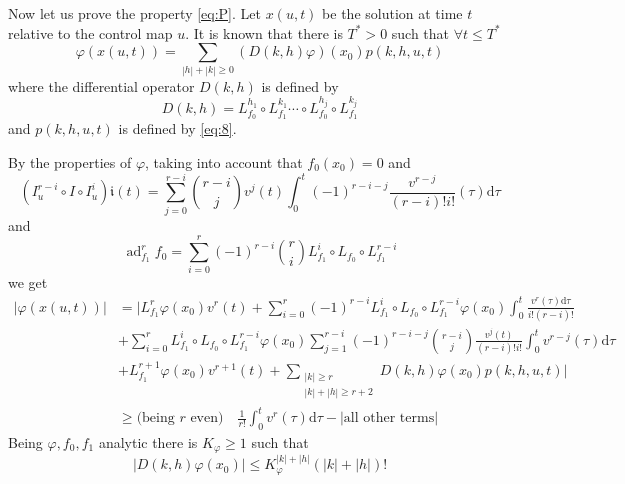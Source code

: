 \documentclass{article}
\newcommand{\dd}{\mathrm{d}}
\begin{document}
	
Now let us prove the property \eqref{eq:P}.
Let $x(u, t)$ be the solution at time $t$ relative to the control map $u$. It is known \cite{1,3} that there is $T^*>0$ such that $\forall t \leq T^*$
\begin{equation} \label{eq:15}
	\varphi(x(u, t))=\sum_{|h|+|k| \geq 0}(D(k, h) \varphi)\left(x_0\right) p(k, h, u, t)
\end{equation}
where the differential operator $D(k, h)$ is defined by
\begin{equation} \label{eq:16}
	D(k, h)=L_{f_0}^{h_1} \circ L_{f_1}^{k_1} \cdots \circ L_{f_0}^{h_j} \circ L_{f_1}^{k_j}
\end{equation}
and $p(k, h, u, t)$ is defined by \eqref{eq:8}.

By the properties of $\varphi$, taking into account that $f_0\left(x_0\right)=0$ and
\begin{equation} \label{eq:17}
	\left(I_u^{r-i} \circ I \circ I_u^i\right) \mathfrak{i}(t) = \sum_{j=0}^{r-i} \binom{r-i}{j} v^j(t) \int_0^t(-1)^{r-i-j} \frac{v^{r-j}}{(r-i) ! i !}(\tau) \dd \tau
\end{equation}
and
\begin{equation} \label{eq:18}
	\operatorname{ad}_{f_1}^r f_0=\sum_{i=0}^r(-1)^{r-i} \binom{r}{i} L_{f_1}^i \circ L_{f_0} \circ L_{f_1}^{r-i}
\end{equation}
we get
\begin{equation*}
	\begin{aligned}
		|\varphi(x(u, t))| & = \Big| L_{f_1}^r \varphi\left(x_0\right) v^r(t)+\sum_{i=0}^r(-1)^{r-i} L_{f_1}^i \circ L_{f_0} \circ L_{f_1}^{r-i} \varphi\left(x_0\right) \int_0 ^t \frac{v^r(\tau) \dd \tau}{i !(r-i) !} \\
		& +\sum_{i=0}^r L_{f_1}^i \circ L_{f_0} \circ L_{f_1}^{r-i} \varphi\left(x_0\right) \sum_{j=1}^{r-i}(-1)^{r-i-j} \binom{r-i}{j} \frac{v^j(t)}{(r-i) ! i !}\int_0 ^t v^{r-j}(\tau) \dd \tau \\
		& +L_{f_1}^{r+1} \varphi\left(x_0\right) v^{r+1}(t)+\sum_{\substack{|k| \geq r\\ |k|+|h|\geq r+2}} D(k, h) \varphi\left(x_0\right) p(k, h, u, t) \Big| \\
		& \geq \text{(being $r$ even)} \quad \frac{1}{r !} \int_0^t v^r(\tau) \dd \tau -|\text{all other terms}|
	\end{aligned}
\end{equation*}
Being $\varphi, f_0, f_1$ analytic there is $K_{\varphi} \geq 1$ such that
\begin{equation}
	\label{eq:19}
	\left|D(k, h) \varphi\left(x_0\right)\right| \leq K_{\varphi}^{|k|+|h|}(|k|+|h|) !
\end{equation}
\end{document}
